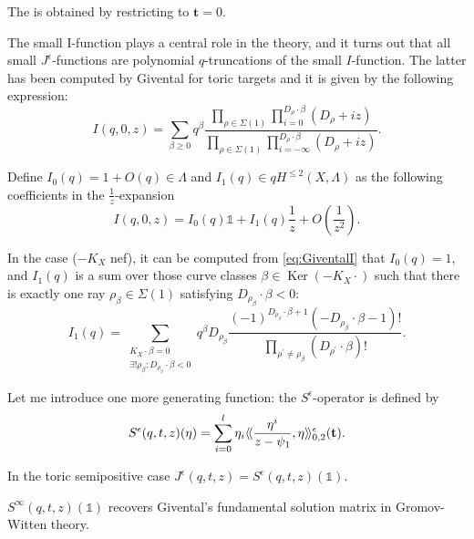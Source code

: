 \begin{definition} 
 The  is obtained by restricting to $\mathbf t=0$.
\end{definition}
The small I-function plays a central role in the theory, and it turns out that all small $J^\epsilon$-functions are polynomial $q$-truncations of the small $I$-function.
The latter has been computed by Givental for toric targets and it is given by the following expression:
\begin{equation}\label{eq:GiventalI} I(q,0,z)=\sum_{\beta\geq 0}q^\beta \frac{\prod_{\rho\in\Sigma(1)}\prod_{i=0}^{D_\rho\cdot\beta}(D_\rho+iz)}{\prod_{\rho\in\Sigma(1)}\prod_{i=-\infty}^{D_\rho\cdot\beta}(D_\rho+iz)}.\end{equation}

Define $I_0(q)= 1+O(q)\in \Lambda$ and $I_1(q)\in qH^{\leq 2}(X,\Lambda)$ as the following coefficients in the $\frac{1}{z}$-expansion
\[I(q,0,z)=I_0(q)\mathds{1}+I_1(q)\frac{1}{z}+O(\frac{1}{z^2}).\]
\begin{rmk} In the  case ($-K_X$ nef), it can be computed from \eqref{eq:GiventalI} that $I_0(q)=1$, and $I_1(q)$ is a sum over those curve classes $\beta\in \operatorname{Ker}(-K_X\cdot )$ such that there is exactly one ray $\rho_\beta\in\Sigma(1)$ satisfying $D_{\rho_\beta}\cdot\beta <0$:
\[I_1(q)=\sum_{\substack{K_X\cdot\beta=0 \\ \exists!\rho_\beta:D_{\rho_\beta}\cdot\beta<0}}q^\beta D_{\rho_\beta}\frac{(-1)^{D_{\rho_\beta}\cdot\beta+1}(-D_{\rho_\beta}\cdot\beta-1)!}{\prod_{\rho^\prime\neq\rho_\beta}(D_{\rho^\prime}\cdot\beta)!}.\]\end{rmk}

Let me introduce one more generating function: the $S^\epsilon$-operator is defined by
\[S^\epsilon(q,t,z)(\eta)=\sum_{i=0}^l \eta_i \langle\!\langle \frac{\eta^i}{z-\psi_1},\eta\rangle\!\rangle^\epsilon_{0,2}(\mathbf{t}).\]

\begin{lem} \cite[Theorem 1.3.1]{CF-K-wallcrossing} In the toric semipositive case $J^\epsilon(q,t,z)=S^\epsilon(q,t,z)(\mathds{1})$. \end{lem}

\begin{rmk} $S^\infty(q,t,z)(\mathds{1})$ recovers Givental's fundamental solution matrix in Gromov-Witten theory. \end{rmk}

